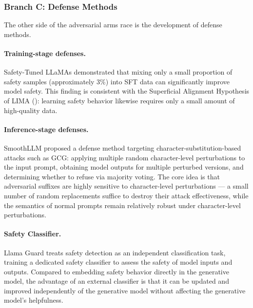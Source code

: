 \subsubsection{Branch C: Defense Methods}
\label{sec:t3-defense}

The other side of the adversarial arms race is the development of defense methods.

\paragraph{Training-stage defenses.}
Safety-Tuned LLaMAs \cite{bianchi2023safetytuned} demonstrated that mixing only a small proportion of safety samples (approximately 3\%) into SFT data
can significantly improve model safety.
This finding is consistent with the Superficial Alignment Hypothesis of LIMA \cite{zhou2023lima}
():
learning safety behavior likewise requires only a small amount of high-quality data.

\paragraph{Inference-stage defenses.}
SmoothLLM \cite{robey2023smoothllm} proposed a defense method targeting character-substitution-based attacks such as GCG:
applying multiple random character-level perturbations to the input prompt,
obtaining model outputs for multiple perturbed versions, and determining whether to refuse via majority voting.
The core idea is that adversarial suffixes are highly sensitive to character-level perturbations ---
a small number of random replacements suffice to destroy their attack effectiveness,
while the semantics of normal prompts remain relatively robust under character-level perturbations.

\paragraph{Safety Classifier.}
Llama Guard \cite{inan2023llamaguard} treats safety detection as an independent classification task,
training a dedicated safety classifier to assess the safety of model inputs and outputs.
Compared to embedding safety behavior directly in the generative model,
the advantage of an external classifier is that it can be updated and improved independently of the generative model
without affecting the generative model's helpfulness.

